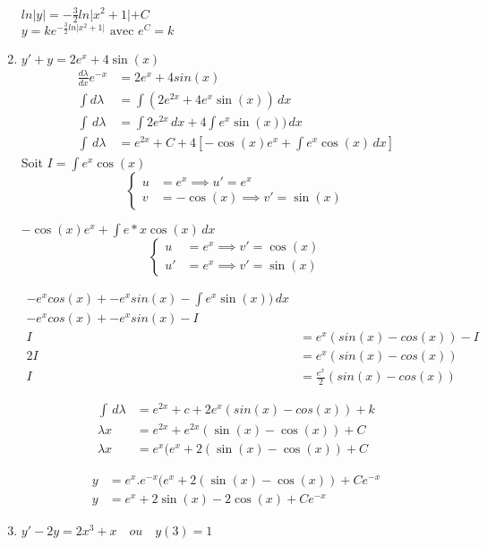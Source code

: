 \documentclass[a4paper,12pt]{article}
\begin{document}
\begin{enumerate}
		$ln \lvert y \lvert = -\frac{3}{2} ln \lvert x^2 + 1 \lvert + C$ \\
		$y = ke^{-\frac{3}{2}ln \lvert x^2 + 1 \lvert } \text{ avec } e^C = k$
		
		
		
	\item $y' + y = 2e^x + 4 \sin(x)$
		\begin{align*}
			\frac{d\lambda}{dx}e^{-x} &= 2e^x + 4sin(x) \\
			\int d\lambda &= \int (2e^{2x} + 4e^x \sin(x)) \, dx \\
			\int \, d\lambda &= \int 2e^{2x} \, dx + 4\int e^x \sin(x)) \, dx \\
			\int \, d\lambda &= e^{2x} + C + 4 [-\cos(x)e^x + \int e^x\cos(x)\, dx]
		\end{align*}
		Soit $I = \int e^x\cos(x)\ $ \\
		\[
		\left\{
		\begin{aligned}
			u &= e^x \implies u'= e^x  \\
			v &= -\cos(x) \implies v' = \sin(x)
		\end{aligned}
		\right.
		\]
		
		$-\cos(x)e^x + \int e*x\cos(x)\, dx$
		\[
		\left\{
		\begin{aligned}
			u &= e^x \implies v'= \cos(x)  \\
			u' &= e^x \implies v' = \sin(x)
		\end{aligned}
		\right.
		\]
		
		\begin{align*}
			-e^xcos(x) + -e^xsin(x) - \int e^x \sin(x)) \, dx \\
			-e^xcos(x) + -e^xsin(x) - I \\
			I &= e^x(sin(x) - cos(x)) - I \\
			2I &= e^x(sin(x) - cos(x)) \\
			I &= \frac{e^x}{2}(sin(x) - cos(x)) 
		\end{align*}
		
		\begin{align*}
			\int \, d\lambda &= e^{2x} + c + 2e^x(sin(x) - cos(x)) + k \\
			\lambda x &= e^{2x} + e^{2x} (\sin(x) - \cos(x)) + C \\
			\lambda x &= e^{x} (e^{x} + 2(\sin(x) - \cos(x)) + C
		\end{align*}
		
		\begin{align*}
			y &= e^x.e^{-x} (e^{x} + 2(\sin(x) - \cos(x)) + Ce^{-x} \\
			y &= e^x + 2\sin(x) - 2\cos(x) + Ce^{-x}
		\end{align*}
	\item $y' - 2y = 2x^3 + x \quad ou \quad y(3)=1$


\end{enumerate}
\end{document}

